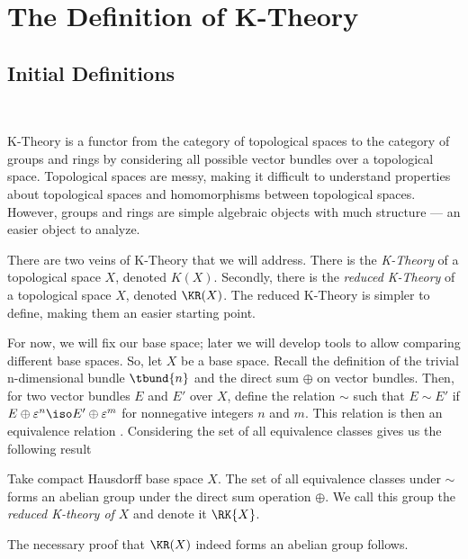 \documentclass[../sean_thesis.tex]{subfiles}
\begin{document}
\chapter{The Definition of K-Theory}

\section{Initial Definitions}

\\


K-Theory is a functor from the category of topological spaces to the category of groups and rings by considering all possible vector bundles over a topological space. Topological spaces are messy, making it difficult to understand properties about topological spaces and homomorphisms between topological spaces. However, groups and rings are simple algebraic objects with much structure --- an easier object to analyze. 

There are two veins of K-Theory that we will address. There is the \emph{K-Theory} of a topological space $X$, denoted $K(X)$. Secondly, there is the \emph{reduced K-Theory} of a topological space $X$, denoted $\KR(X)$. The reduced K-Theory is simpler to define, making them an easier starting point.

For now, we will fix our base space; later we will develop tools to allow comparing different base spaces. So, let $X$ be a base space. Recall the definition of the trivial n-dimensional bundle $\tbund{n}$ and the direct sum $\oplus$ on vector bundles. Then, for two vector bundles $E$ and $E'$ over $X$, define the relation $\sim$ such that $E \sim E'$ if $E \oplus \varepsilon^n \iso E' \oplus \varepsilon^m$ for nonnegative integers $n$ and $m$. This relation is then an equivalence relation . Considering the set of all equivalence classes gives us the following result

    \begin{definition}
        Take compact Hausdorff base space $X$. The set of all equivalence classes under $\sim$ forms an abelian group under the direct sum operation $\oplus$. We call this group the \emph{reduced K-theory of $X$} and denote it $\RK{X}$. 
    \end{definition}
    The necessary proof that $\KR(X)$ indeed forms an abelian group follows.
\end{document}
